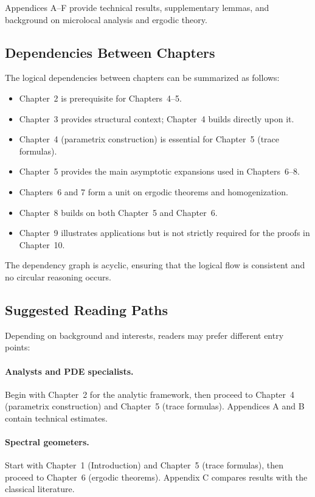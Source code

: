 Appendices A–F provide technical results, supplementary lemmas, and background
on microlocal analysis and ergodic theory.

\subsection{Dependencies Between Chapters}

The logical dependencies between chapters can be summarized as follows:

\begin{itemize}
  \item Chapter~2 is prerequisite for Chapters~4–5.
  \item Chapter~3 provides structural context; Chapter~4 builds directly upon
  it.
  \item Chapter~4 (parametrix construction) is essential for Chapter~5 (trace
  formulas).
  \item Chapter~5 provides the main asymptotic expansions used in Chapters~6–8.
  \item Chapters~6 and 7 form a unit on ergodic theorems and homogenization.
  \item Chapter~8 builds on both Chapter~5 and Chapter~6.
  \item Chapter~9 illustrates applications but is not strictly required for the
  proofs in Chapter~10.
\end{itemize}

The dependency graph is acyclic, ensuring that the logical flow is consistent
and no circular reasoning occurs.

\subsection{Suggested Reading Paths}

Depending on background and interests, readers may prefer different entry
points:

\paragraph{Analysts and PDE specialists.}
Begin with Chapter~2 for the analytic framework, then proceed to Chapter~4
(parametrix construction) and Chapter~5 (trace formulas). Appendices A and B
contain technical estimates.

\paragraph{Spectral geometers.}
Start with Chapter~1 (Introduction) and Chapter~5 (trace formulas), then
proceed to Chapter~6 (ergodic theorems). Appendix C compares results with the
classical literature.

